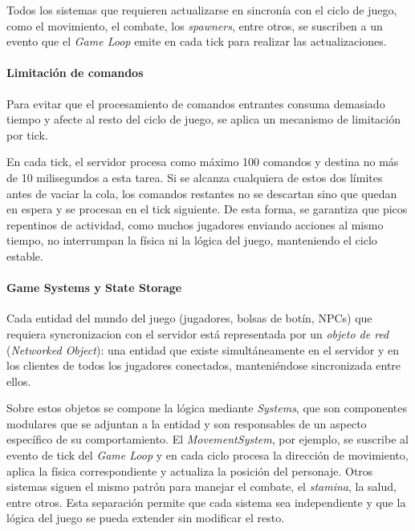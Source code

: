 \vspace{0.25cm}

Todos los sistemas que requieren actualizarse en sincronía con el ciclo de juego, como el movimiento, el combate, los \textit{spawners}, entre otros,
se suscriben a un evento que el \textit{Game Loop} emite en cada tick para realizar las actualizaciones.

\paragraph{Limitación de comandos}

Para evitar que el procesamiento de comandos entrantes consuma demasiado tiempo y afecte al resto del ciclo de juego, se aplica un mecanismo
de limitación por tick. 

\vspace{0.25cm}

En cada tick, el servidor procesa como máximo 100 comandos y destina no más de 10 milisegundos a esta tarea. Si se
alcanza cualquiera de estos dos límites antes de vaciar la cola, los comandos restantes no se descartan sino que quedan en espera y se
procesan en el tick siguiente. De esta forma, se garantiza que picos repentinos de actividad, como muchos jugadores enviando acciones al mismo
tiempo, no interrumpan la física ni la lógica del juego, manteniendo el ciclo estable.

\paragraph{Game Systems y State Storage}
Cada entidad del mundo del juego (jugadores, bolsas de botín, NPCs) que requiera syncronizacion con el servidor está representada por un \textit{objeto de red} (\textit{Networked Object}):
una entidad que existe simultáneamente en el servidor y en los clientes de todos los jugadores conectados, manteniéndose sincronizada entre
ellos.

\vspace{0.25cm}

Sobre estos objetos se compone la lógica mediante \textit{Systems}, que son componentes modulares que se adjuntan a la entidad y son
responsables de un aspecto específico de su comportamiento. El \textit{MovementSystem}, por ejemplo, se suscribe al evento de tick del
\textit{Game Loop} y en cada ciclo procesa la dirección de movimiento, aplica la física correspondiente y actualiza la posición del personaje.
Otros sistemas siguen el mismo patrón para manejar el combate, el \textit{stamina}, la salud, entre otros. Esta separación permite que
cada sistema sea independiente y que la lógica del juego se pueda extender sin modificar el resto.

